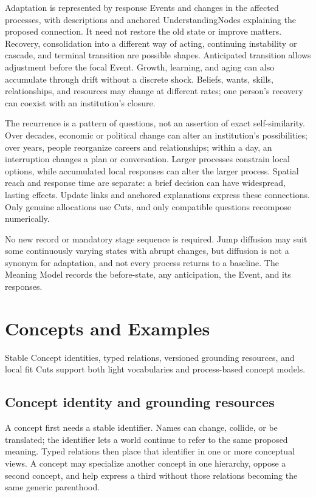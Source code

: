 \documentclass[11pt,a4paper]{article}
\begin{document}
Adaptation is represented by response Events and changes in the affected
processes, with descriptions and anchored UnderstandingNodes explaining the
proposed connection. It need not restore the old state or improve matters.
Recovery, consolidation into a different way of acting, continuing instability
or cascade, and terminal transition are possible shapes. Anticipated
transition allows adjustment before the focal Event. Growth, learning, and
aging can also accumulate through drift without a discrete shock. Beliefs,
wants, skills, relationships, and resources may change at different rates;
one person's recovery can coexist with an institution's closure.

The recurrence is a pattern of questions, not an assertion of exact
self-similarity. Over decades, economic or political change can alter an
institution's possibilities; over years, people reorganize careers and
relationships; within a day, an interruption changes a plan or conversation.
Larger processes constrain local options, while accumulated local responses
can alter the larger process. Spatial reach and response time are separate:
a brief decision can have widespread, lasting effects. Update links and
anchored explanations express these connections. Only genuine
allocations use Cuts, and only compatible questions recompose numerically.

No new record or mandatory stage sequence is required. Jump diffusion may suit
some continuously varying states with abrupt changes, but diffusion is not a
synonym for adaptation, and not every process returns to a baseline. The
Meaning Model records the before-state, any anticipation, the Event, and its
responses.

\section{Concepts and Examples}
\label{sec:concepts}

Stable Concept identities, typed relations, versioned grounding resources, and
local fit Cuts support both light vocabularies and process-based concept models.

\subsection{Concept identity and grounding resources}
\label{sec:concept-identity}

A concept first needs a stable identifier. Names can change, collide, or be
translated; the identifier lets a world continue to refer to the same proposed
meaning. Typed relations then place that identifier in one or more conceptual
views. A concept may specialize another concept in one hierarchy, oppose a
second concept, and help express a third without those relations becoming the
same generic parenthood.
\end{document}
